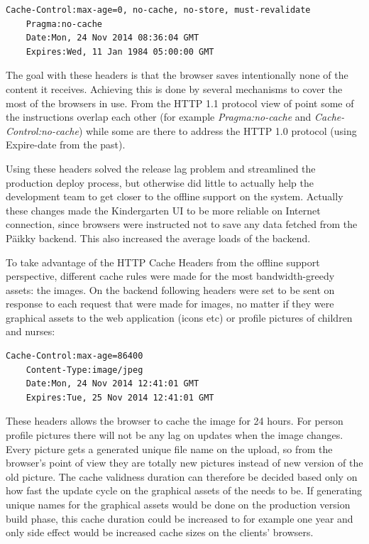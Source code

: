 \begin{lstlisting}[caption={Päikky HTTP Cache Headers},label={lst:cacheheader-1}]
    Cache-Control:max-age=0, no-cache, no-store, must-revalidate
    Pragma:no-cache
    Date:Mon, 24 Nov 2014 08:36:04 GMT
    Expires:Wed, 11 Jan 1984 05:00:00 GMT
\end{lstlisting}

\noindent The goal with these headers is that the browser saves intentionally none of the content it receives. Achieving this is done by several mechanisms to cover the most of the browsers in use. From the HTTP 1.1 protocol view of point some of the instructions overlap each other (for example \textit{Pragma:no-cache} and \textit{Cache-Control:no-cache}) while some are there to address the HTTP 1.0 protocol (using Expire-date from the past). \cite{fielding_et_al_hypertext_????}

Using these headers solved the release lag problem and streamlined the production deploy process, but otherwise did little to actually help the development team to get closer to the offline support on the system. Actually these changes made the Kindergarten UI to be more reliable on Internet connection, since browsers were instructed not to save any data fetched from the Päikky backend. This also increased the average loads of the backend.

To take advantage of the HTTP Cache Headers from the offline support perspective, different cache rules were made for the most bandwidth-greedy assets: the images. On the backend following headers were set to be sent on response to each request that were made for images, no matter if they were graphical assets to the web application (icons etc) or profile pictures of children and nurses:

\begin{lstlisting}[caption=Päikky HTTP Cache Headers for images]
    Cache-Control:max-age=86400
    Content-Type:image/jpeg
    Date:Mon, 24 Nov 2014 12:41:01 GMT
    Expires:Tue, 25 Nov 2014 12:41:01 GMT
\end{lstlisting}
\noindent These headers allows the browser to cache the image for 24 hours. For person profile pictures there will not be any lag on updates when the image changes. Every picture gets a generated unique file name on the upload, so from the browser's point of view they are totally new pictures instead of new version of the old picture. The cache validness duration can therefore be decided based only on how fast the update cycle on the graphical assets of the needs to be. If generating unique names for the graphical assets would be done on the production version build phase, this cache duration could be increased to for example one year and only side effect would be increased cache sizes on the clients' browsers.

